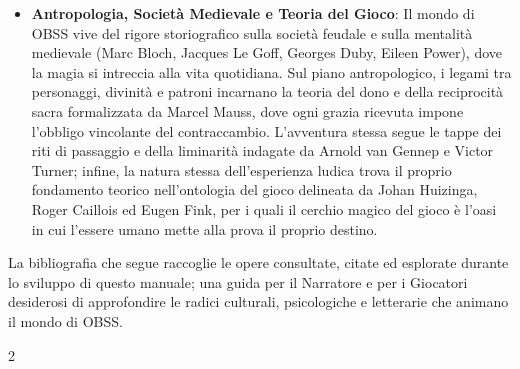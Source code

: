 \begin{itemize}[noitemsep, topsep=2pt, parsep=2pt, partopsep=0pt, leftmargin=1.5em]
	\item \textbf{Antropologia, Società Medievale e Teoria del Gioco}: Il mondo di OBSS vive del rigore storiografico sulla società feudale e sulla mentalità medievale (Marc Bloch, Jacques Le Goff, Georges Duby, Eileen Power), dove la magia si intreccia alla vita quotidiana. Sul piano antropologico, i legami tra personaggi, divinità e patroni incarnano la teoria del dono e della reciprocità sacra formalizzata da Marcel Mauss, dove ogni grazia ricevuta impone l'obbligo vincolante del contraccambio. L'avventura stessa segue le tappe dei riti di passaggio e della liminarità indagate da Arnold van Gennep e Victor Turner; infine, la natura stessa dell'esperienza ludica trova il proprio fondamento teorico nell'ontologia del gioco delineata da Johan Huizinga, Roger Caillois ed Eugen Fink, per i quali il cerchio magico del gioco è l'oasi in cui l'essere umano mette alla prova il proprio destino.
\end{itemize}

\medskip

La bibliografia che segue raccoglie le opere consultate, citate ed esplorate durante lo sviluppo di questo manuale; una guida per il Narratore e per i Giocatori desiderosi di approfondire le radici culturali, psicologiche e letterarie che animano il mondo di OBSS.

\vspace{0.3cm}

\begin{multicols}{2}
		{\small
		\nocite{*}
		\setlength{\columnsep}{1cm} %
		\printbibliography[heading=none]
		}
\end{multicols}




